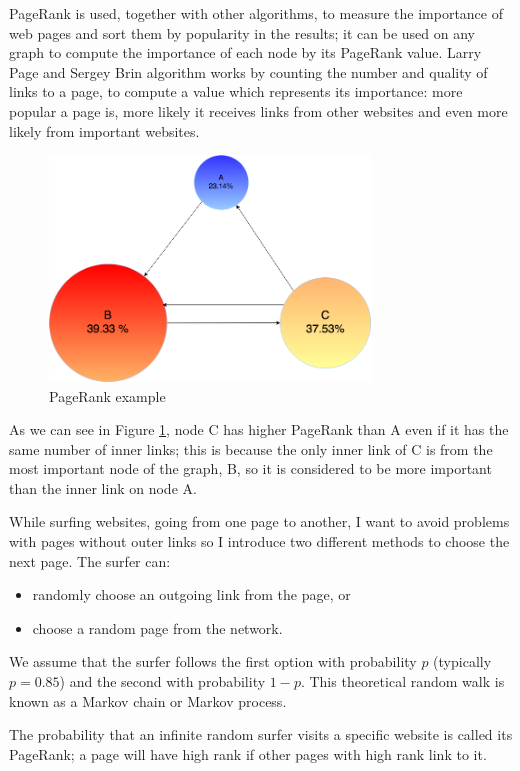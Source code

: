 \documentclass[]{usiinfbachelorproject}
\begin{document}
PageRank is used, together with other algorithms, to measure the importance of web pages and sort them by popularity in the results; it can be used on any graph to compute the importance of each node by its PageRank value. Larry Page and  Sergey Brin algorithm works by counting the number and quality of links to a page, to compute a value which represents its importance: more popular a page is, more likely it receives links from other websites and even more likely from important websites.

\begin{figure}[ht]
	\centering
	\includegraphics[height=6cm]{img/page_rank_example.png}
	\caption{PageRank example}
	\label{fig:prexample}
\end{figure}

As we can see in Figure \ref{fig:prexample}, node C has higher PageRank than A even if it has the same number of inner links; this is because the only inner link of C is from the most important node of the graph, B, so it is considered to be more important than the inner link on node A.

While surfing websites, going from one page to another, I want to avoid problems with pages without outer links so I introduce two different methods to choose the next page. The surfer can:
\begin{itemize}
\item randomly choose an outgoing link from the page, or
\item choose a random page from the network.
\end{itemize}
We assume that the surfer follows the first option with probability $p$ (typically $p=0.85$) and the second with probability $1-p$. This theoretical random walk is known as a Markov chain or Markov process.

The probability that an infinite random surfer visits a specific website is called its PageRank; a page will have high rank if other pages with high rank link to it.
\end{document}
